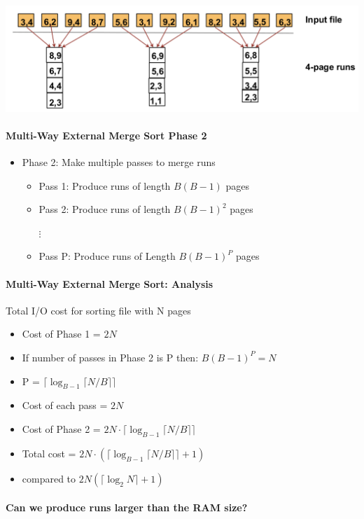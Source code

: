 \includegraphics[scale=0.18]{graphics/B=4}

\paragraph{Multi-Way External Merge Sort Phase 2}
\begin{itemize}
\item Phase 2: Make multiple passes to merge runs
  \begin{itemize}
  \item Pass 1: Produce runs of length $B(B-1)$ pages
  \item Pass 2: Produce runs of length $B(B-1)^2$ pages

    $\vdots$

  \item Pass P: Produce runs of Length $B(B-1)^P$ pages
  \end{itemize}
\end{itemize}

\paragraph{Multi-Way External Merge Sort: Analysis}
Total I/O cost for sorting file with N pages

\begin{itemize}
\item Cost of Phase 1 = $2N$
\item If number of passes in Phase 2 is P then: $B(B-1)^P = N$
\item P = $\lceil \log_{B-1}\lceil N/B \rceil\rceil$
\item Cost of each pass = $2N$
\item Cost of Phase 2 =
  $2N \cdot \lceil \log_{B-1} \lceil N / B\rceil \rceil$
\item Total cost =
    $2N \cdot (\lceil \log_{B-1} \lceil N / B\rceil \rceil + 1)$
\item compared to $2N (\lceil \log_2 N \rceil + 1)$
\end{itemize}

\paragraph{Can we produce runs larger than the RAM size?}


